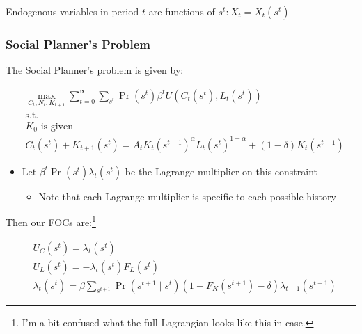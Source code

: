 \documentclass[10pt]{article}
\begin{document}
Endogenous variables in period $t$ are functions of $s^t: X_t=X_t\left(s^t\right)$




\subsubsection{Social Planner's Problem}

The Social Planner's problem is given by:

\begin{align}
    &\max _{C_t, N_t, K_{t+1}} \sum_{t=0}^{\infty} \sum_{s^t} \operatorname{Pr}\left(s^t\right) \beta^t U\left(C_t\left(s^t\right), L_t\left(s^t\right)\right) \label{eq:l11_sp_problem_long} \\
    &\text{s.t.} \\
    &K_0 \text{ is given} \\
    &C_t\left(s^t\right)+K_{t+1}\left(s^t\right)=A_t K_t\left(s^{t-1}\right)^\alpha L_t\left(s^t\right)^{1-\alpha}+(1-\delta) K_t\left(s^{t-1}\right)
\end{align}

\begin{itemize}
    \item Let $\beta^t \operatorname{Pr}\left(s^t\right) \lambda_t\left(s^t\right)$ be the Lagrange multiplier on this constraint 
        \begin{itemize}
            \item Note that each Lagrange multiplier is specific to each possible history
        \end{itemize}
\end{itemize}

Then our FOCs are:\footnote{
    \color{red}
    I'm a bit confused what the full Lagrangian looks like this in case.
    \color{black}
}

\begin{align} 
    & U_C\left(s^t\right)=\lambda_t\left(s^t\right) \\ 
    & U_L\left(s^t\right)=-\lambda_t\left(s^t\right) F_L\left(s^t\right) \\ 
    & \lambda_t\left(s^t\right)=\beta \sum_{s^{t+1}} \operatorname{Pr}\left(s^{t+1} \mid s^t\right)\left(1+F_K\left(s^{t+1}\right)-\delta\right) \lambda_{t+1}\left(s^{t+1}\right)
\end{align}


\end{document}
